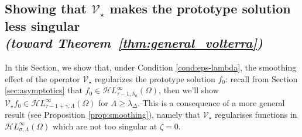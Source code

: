 \documentclass{article}
\theoremstyle{plain}
\newcommand{\singexp}[2]{\mathcal{H}L^\infty_{#1, #2}}
\newcommand{\softpart}{\mathcal{V}_\star}
\begin{document}
\subsection{Showing that $\softpart$ makes the prototype solution less singular \\ \textit{(toward Theorem~\ref{thm:general_volterra})}}\label{sec:image under soft_part}

In this Section, we show that, under Condition \eqref{cond:eps-lambda}, the smoothing effect of the operator $\softpart$ regularizes the prototype solution $f_0$: recall from Section \ref{sec:asymptotics} that $f_0\in\singexp{\tau-1}{\lambda_0}(\Omega)$, then we'll show $\softpart f_0 \in\singexp{\tau-1+\gamma}{\Lambda}(\Omega)$ for $\Lambda\geq \lambda_\Delta$. This is a consequence of a more general result (see Proposition \ref{prop:smoothing}), namely that $\softpart$ regularises functions in $\singexp{\sigma}{\Lambda}(\Omega)$ which are not too singular at $\zeta=0$.  
\end{document}
